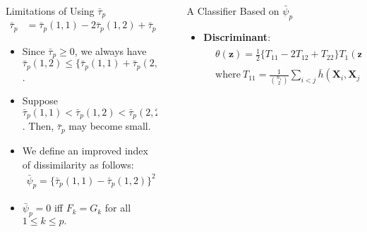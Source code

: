 \documentclass[aspectratio=169, 14pt]{beamer}
\newlength{\sepwidth}
\newlength{\colwidth}
\newcommand{\separatorcolumn}{\begin{column}{\sepwidth}\end{column}}
\newcommand{\bX}{\mathbf{X}}
\newcommand{\bY}{\mathbf{Y}}
\newcommand{\bF}{\mathbf{F}}
\newcommand{\bz}{\mathbf{z}}
\newcommand{\0}{\mathbf{0}}
\newcommand{\1}{\mathbf{1}}
\begin{document}
\begin{frame}[t]
\begin{columns}[t]
\begin{column}{\colwidth}


\begin{block}{Limitations of Using $\bar{\tau}_p$}
\begin{align*}
 \bar{\tau}_p& = \bar{\tau}_p(1,1) - 2\bar{\tau}_p(1,2) + \bar{\tau}_p(2,2)= \{\bar{\tau}_p(1,1) - \bar{\tau}_p(1,2)\}+\{\bar{\tau}_p(2,2) - \bar{\tau}_p(1,2)\}.
\end{align*}
\begin{itemize}
    \item Since $\bar{\tau}_p\geq 0$, we always have $\bar{\tau}_p(1,2)\leq \{\bar{\tau}_p(1,1) + \bar{\tau}_p(2,2)\}/2$.
    \item Suppose $\bar{\tau}_p(1,1) < \bar{\tau}_p(1,2)<\bar{\tau}_p(2,2) $. Then, $\bar{\tau}_p$ may become small. 
    \item We define an improved index of dissimilarity as follows:
    \begin{align*}%
 \bar{\psi}_p = \{\bar{\tau}_p(1,1) - \bar{\tau}_p(1,2)\}^2+\{\bar{\tau}_p(2,2) - \bar{\tau}_p(1,2)\}^2%
\end{align*}
    \end{itemize}
\begin{itemize}
    \item $\bar{\psi}_p=0$ iff $F_{k}=G_{k}$ for all $1\leq k\leq p.$
\end{itemize}
\end{block}
\end{column}

\separatorcolumn

\begin{column}{\colwidth}
 \begin{block}{A Classifier Based on $\bar{\psi}_p$}
\begin{itemize}
 \item {\bf Discriminant}:\begin{align*}
& \theta(\bz) =\frac{1}{2}\big\{{T}_{11}-2{T}_{12}+{T}_{22}\big\}T_1(\bz)+ \frac{1}{2}\big\{{T}_{22}-{T}_{11}\big\}\left\{\frac{1}{n_2}\sum\limits_{i=1}^{n_2}\bar{h}(\bY_{i},\bz)+\frac{1}{n_1}\sum\limits_{i=1}^{n_1}\bar{h}(\bX_{i},\bz)+2{T}_{12}\right \},\\
&\text{where}\ T_{11} = \frac{1}{{n_1\choose 2}}\sum\limits_{i< j}\bar{h}(\bX_{i},\bX_{j}),\ T_{22} = \frac{1}{{n_2\choose 2}}\sum\limits_{i< j}\bar{h}(\bY_{i},\bY_{j})\text{ and } T_{12} = \frac{1}{{n_1n_2}}\mathop{\sum\sum}\limits_{i, j}\bar{h}(\bX_{i},\bY_{j}).
\end{align*}


\end{itemize}
\end{block}
\end{column}
\end{columns}
\end{frame}
\end{document}

